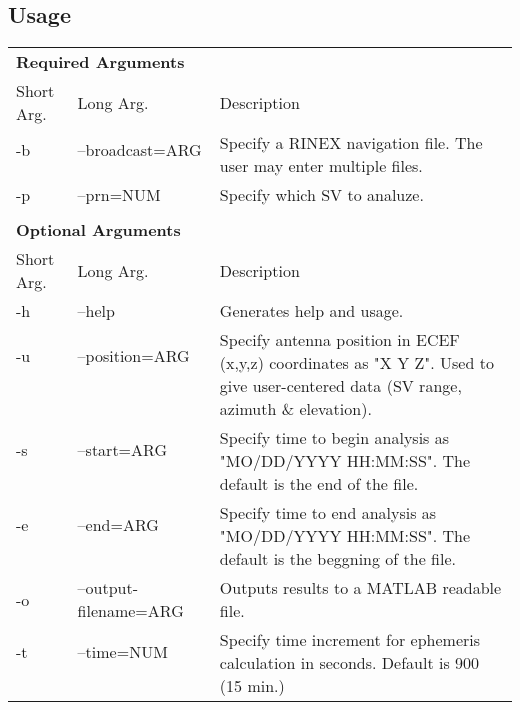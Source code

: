 \subsection{Usage}
\begin{\outputsize}
\begin{tabular}{lll}
\multicolumn{3}{l}{\textbf{Required Arguments}} \\
Short Arg. & Long Arg. & Description \\
-b & --broadcast=ARG & \multirow{2}{2.5in}{Specify a RINEX navigation file. The user may enter multiple files.} \\
& & \\
-p & --prn=NUM & Specify which SV to analuze. \\
& & \\
\multicolumn{3}{l}{\textbf{Optional Arguments}} \\
Short Arg. & Long Arg. & Description \\
-h & --help & Generates help and usage. \\
-u & --position=ARG & \multirow{4}{2.5in}{Specify antenna position in ECEF (x,y,z) coordinates as "X Y Z". Used to give user-centered data (SV range, azimuth \& elevation).} \\
& & \\
& & \\
& & \\
-s & --start=ARG & \multirow{3}{2.5in}{Specify time to begin analysis as "MO/DD/YYYY HH:MM:SS". The default is the end of the file.} \\
& & \\
& & \\
-e & --end=ARG & \multirow{3}{2.5in}{Specify time to end analysis as "MO/DD/YYYY HH:MM:SS". The default is the beggning of the file.} \\
& & \\
& & \\
-o & --output-filename=ARG & Outputs results to a MATLAB readable file. \\
-t & --time=NUM & \multirow{3}{2.5in}{Specify time increment for ephemeris calculation in seconds. Default is 900 (15 min.)} \\
& & \\
& & \\
\end{tabular}
\end{\outputsize}

